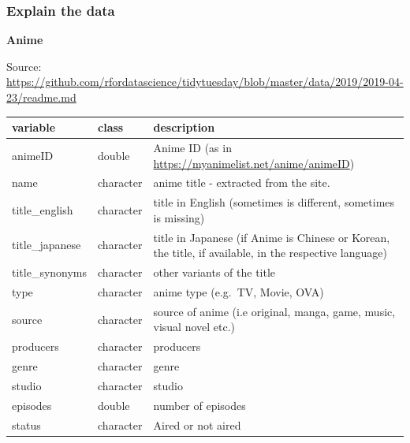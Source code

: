 \documentclass[
]{book}
\begin{document}
\subsubsection*{Explain the data}\label{explain-the-data}

\textbf{Anime}

Source: \url{https://github.com/rfordatascience/tidytuesday/blob/master/data/2019/2019-04-23/readme.md}

\begin{longtable}[]{@{}
  >{\raggedright\arraybackslash}p{}
  >{\raggedright\arraybackslash}p{}
  >{\raggedright\arraybackslash}p{}@{}}
\toprule\noalign{}
\begin{minipage}[b]{\linewidth}\raggedright
variable
\end{minipage} & \begin{minipage}[b]{\linewidth}\raggedright
class
\end{minipage} & \begin{minipage}[b]{\linewidth}\raggedright
description
\end{minipage} \\
\midrule\noalign{}
\endhead
\bottomrule\noalign{}
\endlastfoot
animeID & double & Anime ID (as in \url{https://myanimelist.net/anime/animeID}) \\
name & character & anime title - extracted from the site. \\
title\_english & character & title in English (sometimes is different, sometimes is missing) \\
title\_japanese & character & title in Japanese (if Anime is Chinese or Korean, the title, if available, in the respective language) \\
title\_synonyms & character & other variants of the title \\
type & character & anime type (e.g.~TV, Movie, OVA) \\
source & character & source of anime (i.e original, manga, game, music, visual novel etc.) \\
producers & character & producers \\
genre & character & genre \\
studio & character & studio \\
episodes & double & number of episodes \\
status & character & Aired or not aired \\

\end{longtable}
\end{document}
